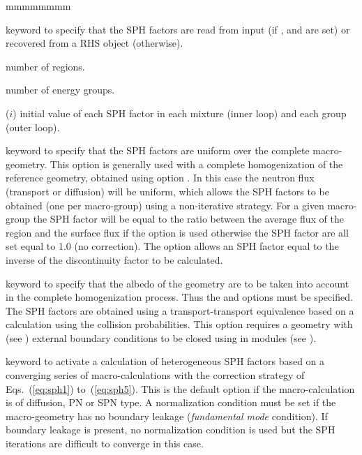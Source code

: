 \begin{ListeDeDescription}{mmmmmmmm}
\item[\moc{SPRD}] keyword to specify that the SPH factors are read from input  (if ,  and 
are set) or recovered from a RHS object (otherwise).

\item[\dusa{nmerge}] number of regions.

\item[\dusa{ngcond}] number of energy groups.

\item[\dusa{sph}($i$)] initial value of each SPH factor in each mixture (inner loop) and each group (outer loop).

\item[\moc{HOMO}] keyword to specify that the SPH factors are uniform over the complete
macro-geometry. This option is generally used with a complete homogenization of the
reference geometry, obtained using option  . In this case the
neutron flux  (transport or diffusion) will be
uniform, which allows the SPH factors to be obtained (one per macro-group) using
a non-iterative strategy. For a given macro-group the SPH factor will be equal
to the ratio between the average flux of the region and the surface flux if the
 option is used otherwise the SPH factor are all set equal to 1.0 (no
correction). The  option allows an SPH factor equal to the inverse of
the discontinuity factor to be calculated.

\item[\moc{ALBS}] keyword to specify that the albedo of the geometry are to be
taken into account in the complete homogenization process. Thus the 
and  options must be specified. The SPH factors are obtained using a
transport-transport equivalence based on a calculation using the collision
probabilities. This option requires a geometry with  (see
) external boundary conditions to be closed using  in
modules  (see ).\cite{ALSB2} 

\item[\moc{PN}] keyword to activate a calculation of heterogeneous SPH factors based on a converging series of
macro-calculations with the correction strategy of Eqs.~(\ref{eq:sph1}) to~(\ref{eq:sph5}). This is the default option
if the macro-calculation is of diffusion, PN or SPN type. A normalization condition must be set if the macro-geometry
has no boundary leakage ({\sl fundamental mode} condition). If boundary leakage is present, no normalization condition
is used but the SPH iterations are difficult to converge in this case.


\end{ListeDeDescription}
